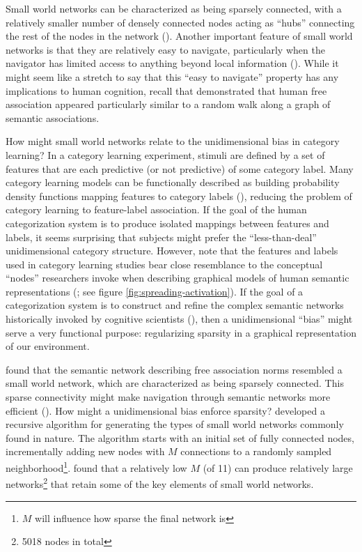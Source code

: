 \documentclass[12pt]{article}
\let\oldcite=\cite
\let\oldtextcite=\textcite
\renewcommand{\cite}[1]{\textcolor[rgb]{0, .121, .388}{\oldcite{#1}}}
\renewcommand{\textcite}[1]{\textcolor[rgb]{0, .121, .388}{\oldtextcite{#1}}}
\begin{document}
Small world networks can be characterized as being sparsely connected, with a relatively smaller number of densely connected nodes acting as ``hubs'' connecting the rest of the nodes in the network (\cite{steyvers2005large}). Another important feature of small world networks is that they are relatively easy to navigate, particularly when the navigator has limited access to anything beyond local information  (\cite{newman2003structure}). While it might seem like a stretch to say that this ``easy to navigate'' property has any implications to human cognition, recall that \textcite{abbott2012human} demonstrated that human free association appeared particularly similar to a random walk along a graph of semantic associations. 

How might small world networks relate to the unidimensional bias in category learning? In a category learning experiment, stimuli are defined by a set of features that are each predictive (or not predictive) of some category label. Many category learning models can be functionally described as building probability density functions mapping features to category labels (\cite{ashby1995categorization}), reducing the problem of category learning to feature-label association. If the goal of the human categorization system is to produce isolated mappings between features and labels, it seems surprising that subjects might prefer the ``less-than-deal'' unidimensional category structure. However, note that the features and labels used in category learning studies bear close resemblance to the conceptual ``nodes'' researchers invoke when describing graphical models of human semantic representations (\cite{collins1969retrieval,collins1975spreading,love2004sustain}; see figure \ref{fig:spreading-activation}). If the goal of a categorization system is to construct and refine the complex semantic networks historically invoked by cognitive scientists (\cite{collins1969retrieval,collins1975spreading,sloman1998categorical,love1995mutability,steyvers2005large,abbott2012human}), then a unidimensional ``bias'' might serve a very functional purpose: regularizing sparsity in a graphical representation of our environment.

\textcite{steyvers2005large} found that the semantic network describing free association norms resembled a small world network, which are characterized as being sparsely connected. This sparse connectivity might make navigation through semantic networks more efficient (\cite{newman2003structure,abbott2012human}). How might a unidimensional bias enforce sparsity? \textcite{steyvers2005large} developed a recursive algorithm for generating the types of small world networks commonly found in nature. The algorithm starts with an initial set of fully connected nodes, incrementally adding new nodes with \(M\) connections to a randomly sampled neighborhood\footnote{\(M\) will influence how sparse the final network is}. \textcite{steyvers2005large} found that a relatively low \(M\) (of 11) can produce relatively large networks\footnote{5018 nodes in total} that retain some of the key elements of small world networks. 
\end{document}
